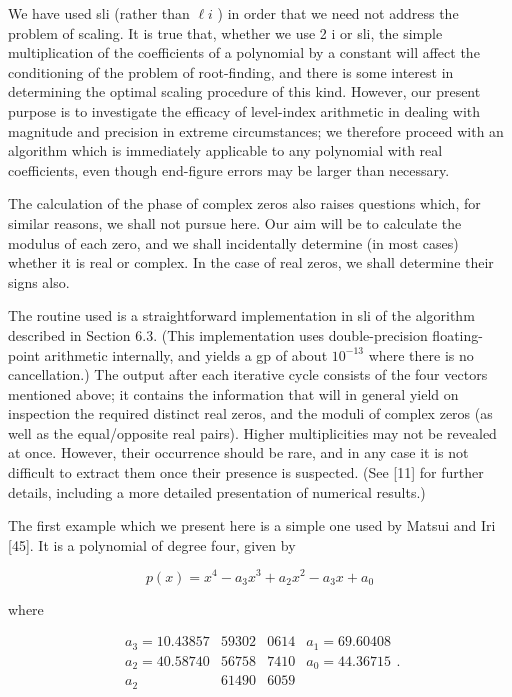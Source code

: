 \documentclass[10pt]{article}
\begin{document}
We have used sli (rather than $\ell i$ ) in order that we need not address the problem of scaling. It is true that, whether we use 2 i or sli, the simple multiplication of the coefficients of a polynomial by a constant will affect the conditioning of the problem of root-finding, and there is some interest in determining the optimal scaling procedure of this kind. However, our present purpose is to investigate the efficacy of level-index arithmetic in dealing with magnitude and precision in extreme circumstances; we therefore proceed with an algorithm which is immediately applicable to any polynomial with real coefficients, even though end-figure errors may be larger than necessary.

The calculation of the phase of complex zeros also raises questions which, for similar reasons, we shall not pursue here. Our aim will be to calculate the modulus of each zero, and we shall incidentally determine (in most cases) whether it is real or complex. In the case of real zeros, we shall determine their signs also.

The routine used is a straightforward implementation in sli of the algorithm described in Section 6.3. (This implementation uses double-precision floating-point arithmetic internally, and yields a gp of about $10^{-13}$ where there is no cancellation.) The output after each iterative cycle consists of the four vectors mentioned above; it contains the information that will in general yield on inspection the required distinct real zeros, and the moduli of complex zeros (as well as the equal/opposite real pairs). Higher multiplicities may not be revealed at once. However, their occurrence should be rare, and in any case it is not difficult to extract them once their presence is suspected. (See [11] for further details, including a more detailed presentation of numerical results.)

The first example which we present here is a simple one used by Matsui and Iri [45]. It is a polynomial of degree four, given by

$$
p(x)=x^{4}-a_{3} x^{3}+a_{2} x^{2}-a_{3} x+a_{0}
$$

where

$$
\begin{array}{llll}
a_{3}=10.43857 & 59302 & 0614 & a_{1}=69.60408 \\
a_{2}=40.58740 & 56758 & 7410 & a_{0}=44.36715 \\
a_{2} & 61490 & 6059
\end{array} .
$$
\end{document}
